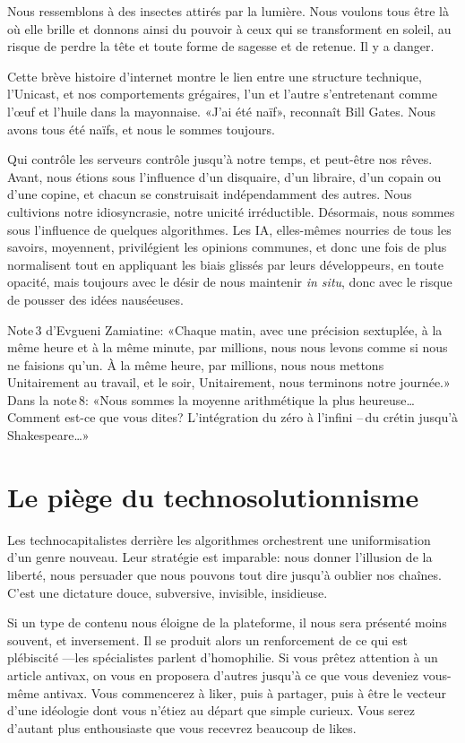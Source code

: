 \documentclass[a5paper, 10pt, twoside]{book}
\let\oldsection\section
\renewcommand{\section}[1]{%
  \oldsection{#1}%
  \par\vspace{\baselineskip}%
}
\begin{document}
Nous ressemblons à des insectes attirés par la lumière. Nous voulons
tous être là où elle brille et donnons ainsi du pouvoir à ceux qui se
transforment en soleil, au risque de perdre la tête et toute forme de
sagesse et de retenue. Il y a danger.

Cette brève histoire d’internet montre le lien entre une structure
technique, l’Unicast, et nos comportements grégaires, l’un et l’autre
s’entretenant comme l’œuf et l’huile dans la mayonnaise. «J’ai été
naïf», reconnaît Bill Gates. Nous avons tous été naïfs, et nous le
sommes toujours.

Qui contrôle les serveurs contrôle jusqu’à notre temps, et peut-être nos
rêves. Avant, nous étions sous l’influence d’un disquaire, d’un
libraire, d’un copain ou d’une copine, et chacun se construisait
indépendamment des autres. Nous cultivions notre idiosyncrasie, notre
unicité irréductible. Désormais, nous sommes sous l’influence de
quelques algorithmes. Les IA, elles-mêmes nourries de tous les savoirs,
moyennent, privilégient les opinions communes, et donc une fois de plus
normalisent tout en appliquant les biais glissés par leurs développeurs,
en toute opacité, mais toujours avec le désir de nous maintenir \emph{in
situ}, donc avec le risque de pousser des idées nauséeuses.

Note\,3 d’Evgueni Zamiatine: «Chaque matin, avec une précision
sextuplée, à la même heure et à la même minute, par millions, nous nous
levons comme si nous ne faisions qu’un. À la même heure, par millions,
nous nous mettons Unitairement au travail, et le soir, Unitairement,
nous terminons notre journée.» Dans la note\,8: «Nous sommes la moyenne
arithmétique la plus heureuse… Comment est-ce que vous dites?
L’intégration du zéro à l’infini –\,du crétin jusqu’à Shakespeare…»

\section{\texorpdfstring{Le piège du
technosolutionnisme}{   }}\label{le-piuxe8ge-du-technosolutionnisme}

Les technocapitalistes derrière les algorithmes orchestrent une
uniformisation d’un genre nouveau. Leur stratégie est imparable: nous
donner l’illusion de la liberté, nous persuader que nous pouvons tout
dire jusqu’à oublier nos chaînes. C’est une dictature douce, subversive,
invisible, insidieuse.

Si un type de contenu nous éloigne de la plateforme, il nous sera
présenté moins souvent, et inversement. Il se produit alors un
renforcement de ce qui est plébiscité —les spécialistes parlent
d’homophilie. Si vous prêtez attention à un article antivax, on vous en
proposera d’autres jusqu’à ce que vous deveniez vous-même antivax. Vous
commencerez à liker, puis à partager, puis à être le vecteur d’une
idéologie dont vous n’étiez au départ que simple curieux. Vous serez
d’autant plus enthousiaste que vous recevrez beaucoup de likes.
\end{document}
